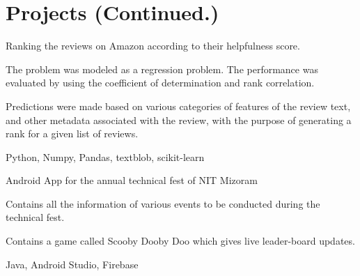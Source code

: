 \section{Projects \small{(Continued.)}}

 \vspace{0.1in}
\begin{tightemize}
\item Ranking the reviews on Amazon according to their helpfulness score.
\item The problem was modeled as a regression problem. The performance was evaluated by using the coefficient of determination and rank correlation.
\item Predictions were made based on various categories of features of the review text, and other metadata associated with the review, with the purpose of generating a rank for a given list of reviews.
\item {} Python, Numpy, Pandas, textblob, scikit-learn
\end{tightemize}
\sectionsep

\begin{tightemize}\item Android App for the annual technical fest of NIT Mizoram
\item Contains all the information of various events to be conducted during the technical fest.
\item Contains a game called Scooby Dooby Doo which gives live leader-board updates.
\item {} Java, Android Studio, Firebase
\end{tightemize}
\sectionsep